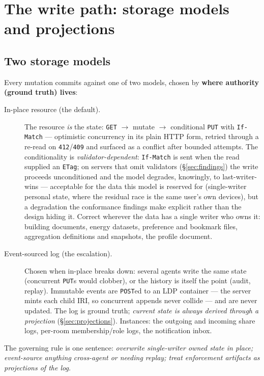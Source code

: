 \documentclass[11pt,a4paper]{article}
\theoremstyle{remark}
\newcommand{\code}[1]{\texttt{#1}}
\begin{document}
\section{The write path: storage models and projections}\label{sec:writes}

\subsection{Two storage models}\label{sec:models}

Every mutation commits against one of two models, chosen by \textbf{where
authority (ground truth) lives}:

\begin{description}
\item[In-place resource (the default).] The resource \emph{is} the state:
  \code{GET} $\to$ mutate $\to$ conditional \code{PUT} with \code{If-Match} ---
  optimistic concurrency in its plain HTTP form, retried through a re-read on
  \code{412}/\code{409} and surfaced as a conflict after bounded attempts.
  The conditionality is \emph{validator-dependent}: \code{If-Match} is sent when
  the read supplied an \code{ETag}; on servers that omit validators
  (\S\ref{sec:findings}) the write proceeds unconditioned and the model
  degrades, knowingly, to last-writer-wins --- acceptable for the data this
  model is reserved for (single-writer personal state, where the residual race
  is the same user's own devices), but a degradation the conformance findings
  make explicit rather than the design hiding it. Correct wherever the data has
  a single writer who owns it: building documents, energy datasets, preference
  and bookmark files, aggregation definitions and snapshots, the profile
  document.
\item[Event-sourced log (the escalation).] Chosen when in-place breaks down:
  several agents write the same state (concurrent \code{PUT}s would clobber), or
  the history is itself the point (audit, replay). Immutable events are
  \code{POST}ed to an LDP container --- the server mints each child IRI, so
  concurrent appends never collide --- and are never updated. The log is ground
  truth; \emph{current state is always derived through a projection}
  (\S\ref{sec:projections}). Instances: the outgoing and incoming share logs,
  per-room membership/role logs, the notification inbox.
\end{description}

The governing rule is one sentence: \emph{overwrite single-writer owned state in
place; event-source anything cross-agent or needing replay; treat enforcement
artifacts as projections of the log.}
\end{document}
